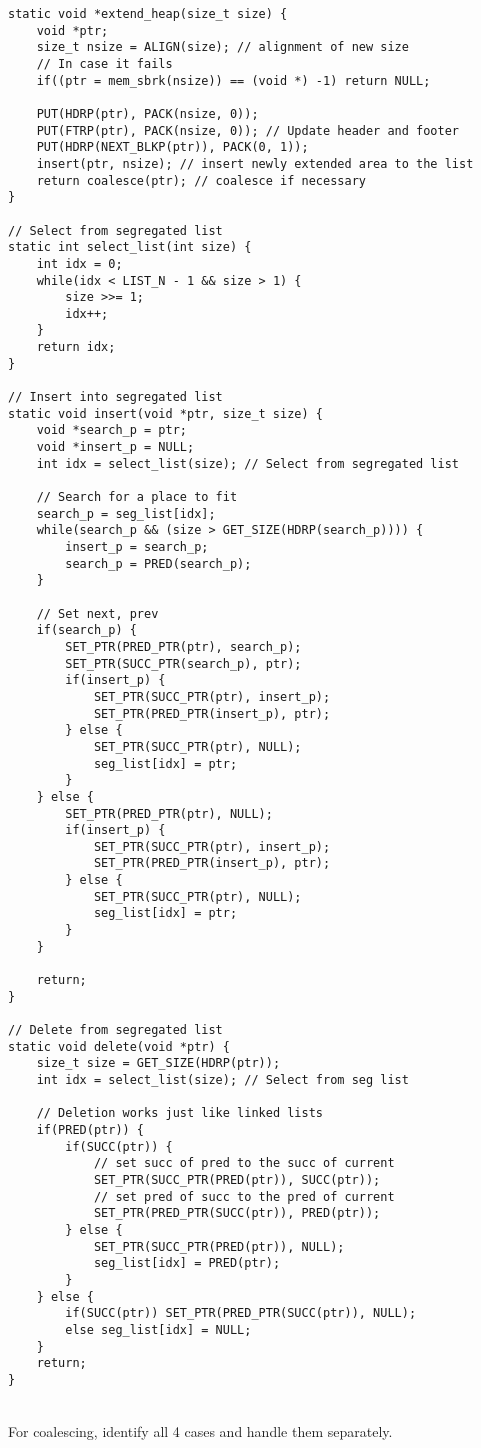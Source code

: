 \documentclass[12pt]{report}
\begin{document}
\begin{lstlisting}[style=Cstyle]
static void *extend_heap(size_t size) {
	void *ptr;
	size_t nsize = ALIGN(size); // alignment of new size
	// In case it fails
	if((ptr = mem_sbrk(nsize)) == (void *) -1) return NULL;
	
	PUT(HDRP(ptr), PACK(nsize, 0));
	PUT(FTRP(ptr), PACK(nsize, 0)); // Update header and footer
	PUT(HDRP(NEXT_BLKP(ptr)), PACK(0, 1));
	insert(ptr, nsize); // insert newly extended area to the list
	return coalesce(ptr); // coalesce if necessary
}

// Select from segregated list
static int select_list(int size) {
	int idx = 0;
	while(idx < LIST_N - 1 && size > 1) {
		size >>= 1;
		idx++;
	}
	return idx;
}

// Insert into segregated list
static void insert(void *ptr, size_t size) {
	void *search_p = ptr;
	void *insert_p = NULL;
	int idx = select_list(size); // Select from segregated list
	
	// Search for a place to fit
	search_p = seg_list[idx];
	while(search_p && (size > GET_SIZE(HDRP(search_p)))) {
		insert_p = search_p;
		search_p = PRED(search_p);
	}
	
	// Set next, prev
	if(search_p) {
		SET_PTR(PRED_PTR(ptr), search_p);
		SET_PTR(SUCC_PTR(search_p), ptr);
		if(insert_p) {
			SET_PTR(SUCC_PTR(ptr), insert_p);
			SET_PTR(PRED_PTR(insert_p), ptr);
		} else {
			SET_PTR(SUCC_PTR(ptr), NULL);
			seg_list[idx] = ptr;
		}
	} else {
		SET_PTR(PRED_PTR(ptr), NULL);
		if(insert_p) {
			SET_PTR(SUCC_PTR(ptr), insert_p);
			SET_PTR(PRED_PTR(insert_p), ptr);
		} else {
			SET_PTR(SUCC_PTR(ptr), NULL);
			seg_list[idx] = ptr;
		}
	}
	
	return;
}

// Delete from segregated list
static void delete(void *ptr) {
	size_t size = GET_SIZE(HDRP(ptr));
	int idx = select_list(size); // Select from seg list
	
	// Deletion works just like linked lists
	if(PRED(ptr)) {
		if(SUCC(ptr)) {
			// set succ of pred to the succ of current
			SET_PTR(SUCC_PTR(PRED(ptr)), SUCC(ptr));
			// set pred of succ to the pred of current
			SET_PTR(PRED_PTR(SUCC(ptr)), PRED(ptr));
		} else {
			SET_PTR(SUCC_PTR(PRED(ptr)), NULL);
			seg_list[idx] = PRED(ptr);
		}
	} else {
		if(SUCC(ptr)) SET_PTR(PRED_PTR(SUCC(ptr)), NULL);
		else seg_list[idx] = NULL;
	}
	return;
}
\end{lstlisting}~\\
For coalescing, identify all 4 cases and handle them separately.
\end{document}
